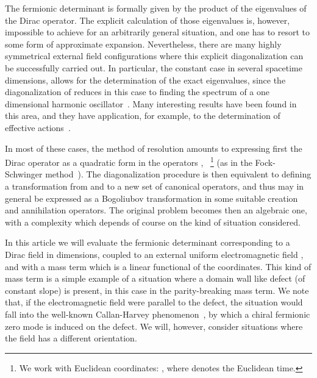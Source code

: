 \documentclass[a4paper,12pt]{article}
\begin{document}
The fermionic determinant is formally given by the product of the
eigenvalues of the Dirac operator. The explicit calculation of those
eigenvalues is, however, impossible to achieve for an arbitrarily
general situation, and one has to resort to some form of approximate
expansion.  Nevertheless, there are many highly symmetrical external
field configurations where this explicit diagonalization can be
successfully carried out.  In particular, the constant \coordHE{} case
in several spacetime dimensions, allows for the determination of the
exact eigenvalues, since the diagonalization of \coordHE{} reduces
in this case to finding the spectrum of a one dimensional harmonic
oscillator~\cite{schw}. Many interesting results have been found in
this area, and they have application, for example, to the
determination of effective actions~\cite{eff}.

In most of these cases, the method of resolution amounts to expressing
first the Dirac operator \coordHE{} as a quadratic form in the
operators \coordHE{}, \coordHE{}~\footnote{We work with Euclidean coordinates:
  \coordHE{}, where \coordHE{} denotes the Euclidean time.} (as
in the Fock-Schwinger method~\cite{schw}).  The diagonalization
procedure is then equivalent to defining a transformation from \coordHE{}
and \coordHE{} to a new set of canonical operators, and thus may in general
be expressed as a Bogoliubov transformation in some suitable creation
and annihilation operators.  The original problem becomes then an
algebraic one, with a complexity which depends of course on the kind
of situation considered.

In this article we will evaluate the fermionic determinant
corresponding to a Dirac field in \coordHE{} dimensions, coupled to an
external uniform electromagnetic field \coordHE{}, and with a mass term
which is a linear functional of the coordinates. This kind of mass
term is a simple example of a situation where a domain wall like
defect (of constant slope) is present, in this case in the
parity-breaking mass term. We note that, if the electromagnetic field
were parallel to the defect, the situation would fall into the
well-known Callan-Harvey phenomenon~\cite{callan}, by which a chiral
fermionic zero mode is induced on the defect. We will, however,
consider situations where the field has a different orientation.
\end{document}

